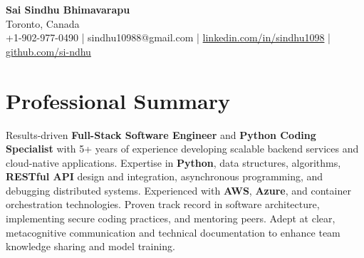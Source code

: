 \documentclass[letterpaper,11pt]{article}
\begin{document}
\begin{center}
  {\Large \textbf{Sai Sindhu Bhimavarapu}} \\
  Toronto, Canada \\
  +1-902-977-0490 \enspace | \enspace sindhu10988@gmail.com \enspace | \enspace \href{https://www.linkedin.com/in/sindhu1098/}{linkedin.com/in/sindhu1098} \enspace | \enspace \href{https://github.com/si-ndhu}{github.com/si-ndhu}
\end{center}

\section{Professional Summary}
  \begin{itemize}[leftmargin=0.15in, label={}]
    \small{\item{
     Results-driven \textbf{Full-Stack Software Engineer} and \textbf{Python Coding Specialist} with 5+ years of experience developing scalable backend services and cloud-native applications. Expertise in \textbf{Python}, data structures, algorithms, \textbf{RESTful API} design and integration, asynchronous programming, and debugging distributed systems. Experienced with \textbf{AWS}, \textbf{Azure}, and container orchestration technologies. Proven track record in software architecture, implementing secure coding practices, and mentoring peers. Adept at clear, metacognitive communication and technical documentation to enhance team knowledge sharing and model training.  
    }}
  \end{itemize}
\vspace{-16pt}

\end{document}
